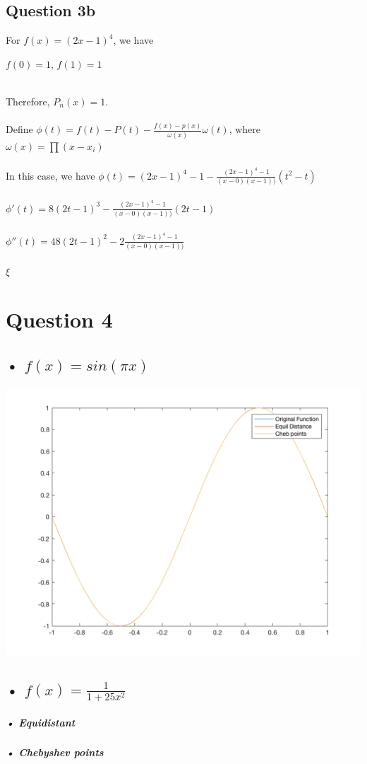 \documentclass[11pt]{article} %
\begin{document}
\subsection{Question 3b}
For $f(x) = (2x-1)^{4}$, we have\\
\centerline{$f(0)=1$, $f(1)=1$}\\
Therefore, $P_{n}(x)=1$.\\\\
Define $\phi(t) = f(t)-P(t)-\frac{f(x)-p(x)}{\omega(x)}\omega(t)$, where $\omega(x) = \prod(x-x_{i})$\\\\
In this case, we have $\phi(t) = (2x-1)^{4}-1-\frac{(2x-1)^{4}-1}{(x-0)(x-1))}(t^{2}-t)$\\\\
$\phi'(t) = 8(2t-1)^{3}-\frac{(2x-1)^{4}-1}{(x-0)(x-1))}(2t-1)$\\\\
$\phi''(t) = 48(2t-1)^{2}-2\frac{(2x-1)^{4}-1}{(x-0)(x-1))}$\\\\
$\xi$

\section{Question 4}
\subsection{• $f(x)=sin(\pi x)$}
\includegraphics[scale = 0.3]{e11.png}

\subsection{• $f(x)=\frac{1}{1+25x^{2}}$}
\subparagraph{• Equidistant}
\subparagraph{• Chebyshev points}
\end{document}
